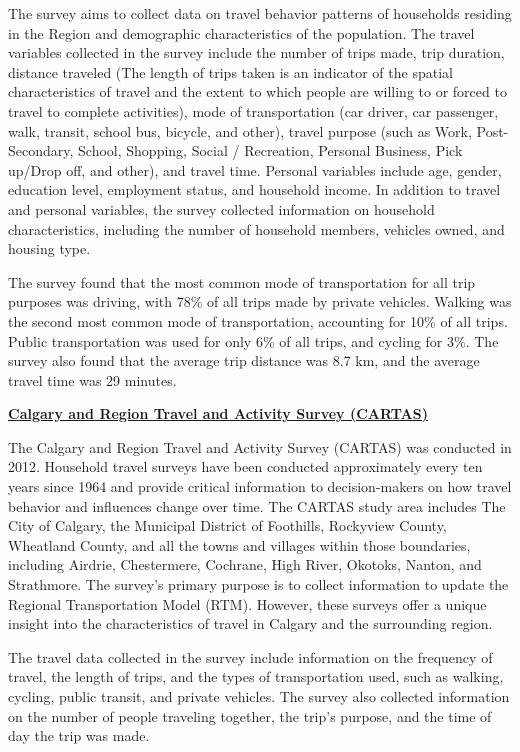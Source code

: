 \documentclass[
11pt, %
oneside, %
english, %
singlespacing, %
]{macthesis} %
\begin{document}
The survey aims to collect data on travel behavior patterns of households residing in the Region and demographic characteristics of the population. The travel variables collected in the survey include the number of trips made, trip duration, distance traveled (The length of trips taken is an indicator of the spatial characteristics of travel and the extent to which people are willing to or forced to travel to complete activities), mode of transportation (car driver, car passenger, walk, transit, school bus, bicycle, and other), travel purpose (such as Work, Post-Secondary, School, Shopping, Social / Recreation, Personal Business, Pick up/Drop off, and other), and travel time. Personal variables include age, gender, education level, employment status, and household income. In addition to travel and personal variables, the survey collected information on household characteristics, including the number of household members, vehicles owned, and housing type.

The survey found that the most common mode of transportation for all trip purposes was driving, with 78\% of all trips made by private vehicles. Walking was the second most common mode of transportation, accounting for 10\% of all trips. Public transportation was used for only 6\% of all trips, and cycling for 3\%. The survey also found that the average trip distance was 8.7 km, and the average travel time was 29 minutes.

\textbf{\href{https://www.calgary.ca/planning/transportation/surveys.html?redirect=/travelsurveys}{Calgary and Region Travel and Activity Survey (CARTAS)}}

The Calgary and Region Travel and Activity Survey (CARTAS) was conducted in 2012. Household travel surveys have been conducted approximately every ten years since 1964 and provide critical information to decision-makers on how travel behavior and influences change over time. The CARTAS study area includes The City of Calgary, the Municipal District of Foothills, Rockyview County, Wheatland County, and all the towns and villages within those boundaries, including Airdrie, Chestermere, Cochrane, High River, Okotoks, Nanton, and Strathmore. The survey's primary purpose is to collect information to update the Regional Transportation Model (RTM). However, these surveys offer a unique insight into the characteristics of travel in Calgary and the surrounding region.

The travel data collected in the survey include information on the frequency of travel, the length of trips, and the types of transportation used, such as walking, cycling, public transit, and private vehicles. The survey also collected information on the number of people traveling together, the trip's purpose, and the time of day the trip was made.
\end{document}
